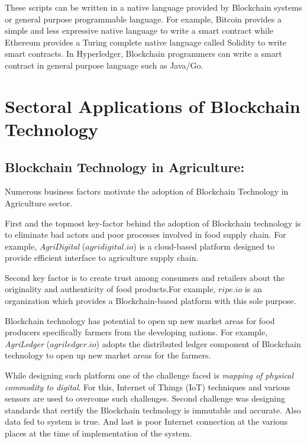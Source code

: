 \documentclass[10pt]{IETBook}
\begin{document}
These scripts can be written in a native language provided by Blockchain systems or general purpose programmable language. For example, Bitcoin provides a simple and less expressive native language to write a smart contract while Ethereum provides a Turing complete native language called Solidity to write smart contracts. In Hyperledger, Blockchain programmers can write a smart contract in general purpose language such as Java/Go.
 
\section{Sectoral Applications of Blockchain Technology}

\subsection{Blockchain Technology in Agriculture:}
Numerous business factors motivate the  adoption of Blockchain Technology in Agriculture sector. 

First and the topmost  key-factor behind the adoption of  Blockchain technology is to eliminate  bad  actors and poor processes involved in food supply chain. For example, {\em AgriDigital} ($agridigital.io$) is a cloud-based platform designed to provide efficient interface to agriculture supply chain.

Second key factor is to create trust among consumers and retailers about the originality and authenticity of food products.For example, $ripe.io$ is an organization which provides a Blockchain-based platform with this sole purpose.


Blockchain technology has potential to open up new market areas for food producers specifically farmers from the developing nations. For example, {\em AgriLedger} ($agriledger.io$) adopts the distributed ledger component of Blockchain technology to open up new market areas for the farmers.

 While designing such platform one of the challenge faced is \textit{mapping of physical commodity to digital}. For this, Internet of Things (IoT) techniques and various sensors are used to overcome such challenges. Second challenge was designing standards that certify the Blockchain technology is immutable and accurate. Also data fed to system is true. And last is poor Internet connection at the various places at the time of implementation of the system.
\end{document}
